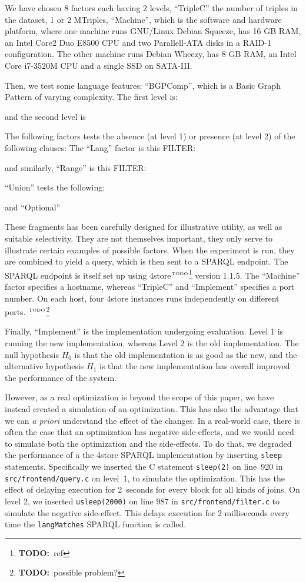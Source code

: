 \documentclass{article}
\newcommand{\todo}[1]{\ensuremath{^{\textrm{\tiny{TODO}\normalsize}}}\footnote{\textbf{TODO:}~#1}}
\begin{document}
We have chosen 8 factors each having 2 levels, ``TripleC'' the number of triples in the
dataset, 1 or 2 MTriples, ``Machine'', which is the software and hardware platform,
where one machine runs GNU/Linux Debian Squeeze, has 16 GB RAM, an
Intel Core2 Duo E8500 CPU and two Parallell-ATA disks in a RAID-1
configuration. The other machine runs Debian Wheezy, has 8 GB RAM, an
Intel Core i7-3520M CPU and a single SSD on SATA-III. 

Then, we test some language features: 
``BGPComp'', which is a Basic Graph Pattern of varying complexity. The
first level is:

and the second level is 


The following factors tests the absence (at level 1) or presence (at level 2) of the following clauses:
The ``Lang'' factor is this FILTER:

and similarly,  ``Range'' is this FILTER:

``Union'' tests the following:

and ``Optional''


These fragments has been carefully designed for illustrative utility,
as well as suitable selectivity. They are not themselves important,
they only serve to illustrate certain examples of possible
factors. When the experiment is run, they are combined to yield a
query, which is then sent to a SPARQL endpoint. The SPARQL endpoint is
itself set up using 4store\todo{ref} version 1.1.5. The ``Machine''
factor specifies a hostname, whereas ``TripleC'' and ``Implement''
specifies a port number. On each host, four 4store instances runs
independently on different ports. \todo{possible problem?}

Finally, ``Implement'' is the implementation undergoing
evaluation. Level 1 is running the new implementation, whereas Level 2
is the old implementation. The null hypothesis $H_0$ is that the old
implementation is as good as the new, and the alternative hypothesis
$H_1$ is that the new implementation has overall improved the
performance of the system.

However, as a real optimization is beyond the scope of this paper, we
have instead created a simulation of an optimization. This has also
the advantage that we can \textit{a priori} understand the effect of
the changes. In a real-world case, there is often the case that an
optimization has negative side-effects, and we would need to simulate
both the optimization and the side-effects. To do that, we degraded
the performance of a the 4store SPARQL implementation by inserting
\texttt{sleep} statements. Specifically we inserted the C statement
\texttt{sleep(2)} on line~920 in \texttt{src/frontend/query.c} on
level~1, to simulate the optimization. This has the effect of delaying
execution for 2~seconds for every block for all kinds of joins. On
level 2, we inserted \texttt{usleep(2000)} on line 987 in
\texttt{src/frontend/filter.c} to simulate the negative
side-effect. This delays execution for 2 milliseconds every time the
\texttt{langMatches} SPARQL function is called.
\end{document}
